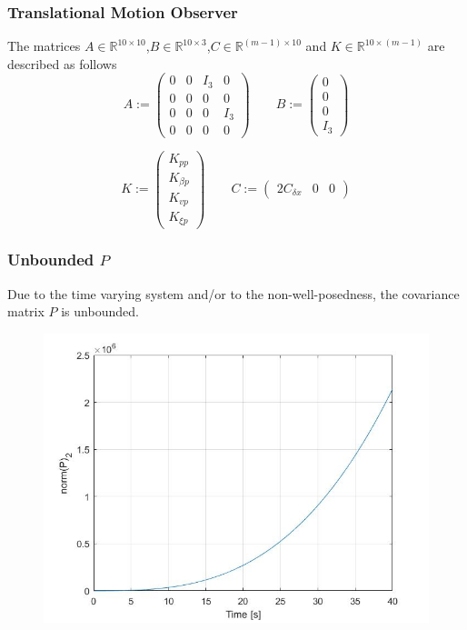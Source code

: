 \documentclass{beamer}
\begin{document}
		

	\begin{frame}
		\frametitle{Translational Motion Observer}
		The matrices $A \in \mathbb{R}^{10\times 10}$,$B \in \mathbb{R}^{10\times 3}$,$C \in \mathds{R}^{(m-1) \times 10} $ and $K \in \mathds{R}^{10 \times (m-1)}$ are described as follows
		$$
		A :=
		\begin{pmatrix}
		0 & 0 & I_3 & 0 \\ 
		0 & 0 & 0 & 0 \\
		0 & 0 & 0 & I_3 \\
		0 & 0 & 0 & 0
		\end{pmatrix}
		\qquad
		B := 
		\begin{pmatrix}
		0 \\ 0 \\ 0 \\ I_3
		\end{pmatrix}
		$$
		
		$$
		K := 
		\begin{pmatrix}
		K_{pp} \\ K_{\beta p} \\ K_{vp} \\ K_{\xi p}
		\end{pmatrix}
		\qquad
		C :=
		\begin{pmatrix}
		2C_{\delta x} & 0 & 0
		\end{pmatrix}
		$$
	\end{frame}


	\begin{frame}
		\frametitle{Unbounded $P$}
		Due to the time varying system and/or to the non-well-posedness, the covariance matrix $P$ is unbounded.
		\begin{figure}[H]
			\includegraphics[scale=0.3]{pric}
		\end{figure} 
	\end{frame}
\end{document}
